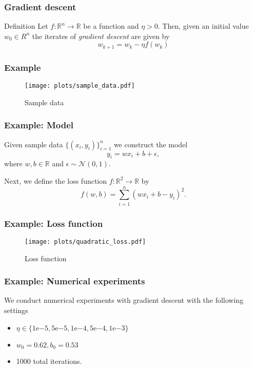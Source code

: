 \documentclass[17pt,institute=e10]{tuhh_presentation}
\newcommand{\R}{\mathbb{R}}
\newcommand{\f}{f : \R^n \rightarrow \R}
\newcommand{\expnumber}[2]{{#1}\mathrm{e}{#2}}
\begin{document}
\begin{frame}[fragile]
  \frametitle{Gradient descent}

  \begin{block}{Definition}
    Let $\f$ be a function and $\eta > 0$. Then, given an initial value $w_0 \in R^n$ the iterates of \emph{gradient descent} are given by
  \begin{equation*}
    w_{k+1} = w_k - \eta f(w_k)
  \end{equation*}
  \end{block}

\end{frame}

\begin{frame}[fragile]
  \frametitle{Example}
  
    \vspace{-1cm}
    \begin{figure}
      \centering
      \texttt{[image: plots/sample\_data.pdf]}
      \caption{Sample data}
    \end{figure}
\end{frame}
\begin{frame}[fragile]
  \frametitle{Example: Model}
  Given sample data $\{(x_i,y_i)\}_{i=1}^n$ we construct the model
  \begin{equation*}
    y_i = w x_i + b + \epsilon,
  \end{equation*}
  where $w, b \in \R$ and $\epsilon \sim \mathcal{N}(0,1)$.

  Next, we define the loss function $f : \R^2 \rightarrow \R$ by
  \begin{equation*}
    f(w,b) = \sum_{i = 1}^{n} \left(w x_i + b - y_i\right)^2.
  \end{equation*}
\end{frame}
\begin{frame}[fragile]
  \frametitle{Example: Loss function}
    \vspace{-1cm}
    \begin{figure}
      \centering
      \texttt{[image: plots/quadratic\_loss.pdf]}
      \caption{Loss function}
    \end{figure}
\end{frame}
\begin{frame}[fragile]
  \frametitle{Example: Numerical experiments}
  We conduct numerical experiments with gradient descent with the following settings
  \begin{itemize}
    \item $\eta \in \{\expnumber{1}{-5},\expnumber{5}{-5}, \expnumber{1}{-4}, \expnumber{5}{-4}, \expnumber{1}{-3}\}$
    \item $w_0 = 0.62, b_0 = 0.53$
    \item 1000 total iterations.
  \end{itemize}
\end{frame}
\end{document}
